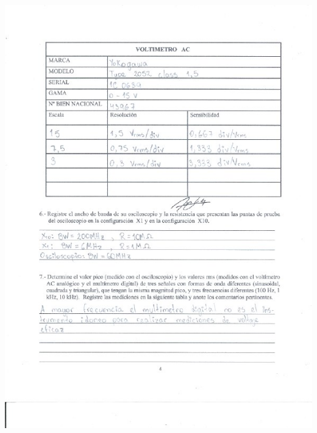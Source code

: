 \documentclass[12pt]{article}
\begin{document}
	\includegraphics[width=16cm,height=21cm]{Img/Resultados_2}\\
\end{document}
